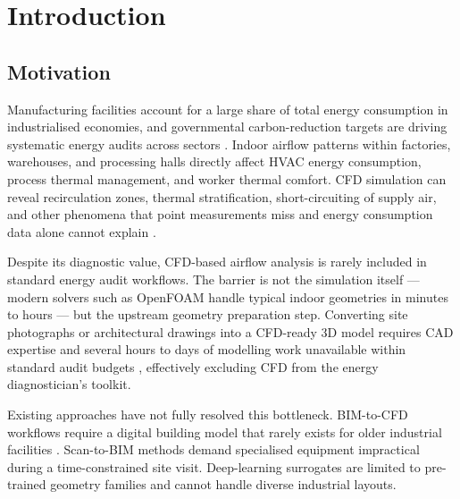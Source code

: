 \documentclass[preprint,12pt,number]{elsarticle}
\begin{document}
\section{Introduction}
\label{sec:introduction}


\subsection{Motivation}
\label{sec:motivation}


Manufacturing facilities account for a large share of total energy consumption in industrialised economies, and governmental carbon-reduction targets are driving systematic energy audits across sectors \cite{gourlis.kovacic2017BuildingInformation,zhao.etal2021IndustrialReheating}. Indoor airflow patterns within factories, warehouses, and processing halls directly affect HVAC energy consumption, process thermal management, and worker thermal comfort. CFD simulation can reveal recirculation zones, thermal stratification, short-circuiting of supply air, and other phenomena that point measurements miss and energy consumption data alone cannot explain \cite{vuorinen.etal2020ModellingAerosol,liu.etal2019ReviewCFD}.

Despite its diagnostic value, CFD-based airflow analysis is rarely included in standard energy audit workflows. The barrier is not the simulation itself --- modern solvers such as OpenFOAM \cite{weller.etal1998TensorialApproach} handle typical indoor geometries in minutes to hours --- but the upstream geometry preparation step. Converting site photographs or architectural drawings into a CFD-ready 3D model requires CAD expertise and several hours to days of modelling work unavailable within standard audit budgets \cite{calzolari.liu2021DeepLearning}, effectively excluding CFD from the energy diagnostician's toolkit.

Existing approaches have not fully resolved this bottleneck. BIM-to-CFD workflows \cite{utkucu.sozer2020InteroperabilityData,weerasuriya.etal2019HolisticFramework,hou.etal2022PredictionOptimization} require a digital building model that rarely exists for older industrial facilities \cite{gourlis.kovacic2017BuildingInformation}. Scan-to-BIM methods \cite{rocha.etal2020ScantoBIMMethodology} demand specialised equipment impractical during a time-constrained site visit. Deep-learning surrogates \cite{guo.etal2016ConvolutionalNeural,calzolari.liu2021DeepLearning,kastner.dogan2023GANBasedSurrogate} are limited to pre-trained geometry families and cannot handle diverse industrial layouts.
\end{document}
